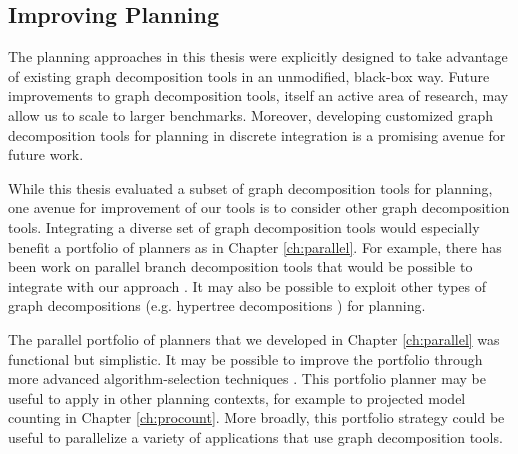 
\subsection{Improving Planning}
The planning approaches in this thesis were explicitly designed to take advantage of existing graph decomposition tools in an unmodified, black-box way.
Future improvements to graph decomposition tools, itself an active area of research, may allow us to scale to larger benchmarks.
Moreover, developing customized graph decomposition tools for planning in discrete integration is a promising avenue for future work.

While this thesis evaluated a subset of graph decomposition tools for planning, one avenue for improvement of our tools is to consider other graph decomposition tools.
Integrating a diverse set of graph decomposition tools would especially benefit a portfolio of planners as in Chapter \ref{ch:parallel}.
For example, there has been work on parallel branch decomposition tools that would be possible to integrate with our approach \cite{hicks2000branch}.
It may also be possible to exploit other types of graph decompositions (e.g. hypertree decompositions \cite{AGG07}) for planning.

The parallel portfolio of planners that we developed in Chapter \ref{ch:parallel} was functional but simplistic.
It may be possible to improve the portfolio through more advanced algorithm-selection techniques \cite{HHLKS09,XHHL12}. 
This portfolio planner may be useful to apply in other planning contexts, for example to projected model counting in Chapter \ref{ch:procount}.
More broadly, this portfolio strategy could be useful to parallelize a variety of applications that use graph decomposition tools.



